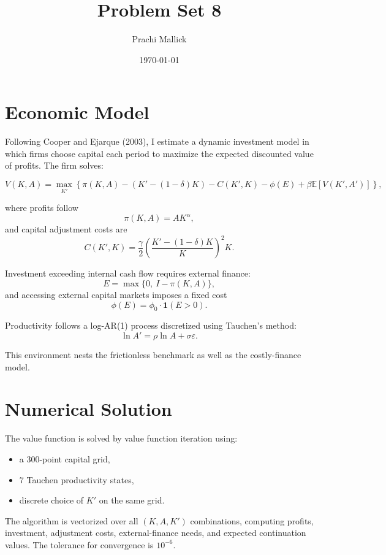 \documentclass[12pt]{article}
\begin{document}
\title{Problem Set 8}
\author{Prachi Mallick}
\date{\today}
\maketitle

\section{Economic Model}

Following Cooper and Ejarque (2003), I estimate a dynamic investment model in which
firms choose capital each period to maximize the expected discounted value of profits.
The firm solves:

\begin{equation}
V(K,A) = \max_{K'} \left\{
\pi(K,A)
- \left(K' - (1-\delta)K\right)
- C(K',K)
- \phi(E)
+ \beta \mathbb{E}[V(K',A')]
\right\},
\end{equation}

where profits follow
\[
\pi(K,A)=A K^\alpha,
\]
and capital adjustment costs are
\[
C(K',K)= \frac{\gamma}{2}\left( \frac{K' - (1-\delta)K}{K} \right)^2 K.
\]

Investment exceeding internal cash flow requires external finance:
\[
E = \max\{0,\ I - \pi(K,A)\},
\]
and accessing external capital markets imposes a fixed cost
\[
\phi(E) = \phi_0 \cdot \mathbf{1}(E>0).
\]

Productivity follows a log-AR(1) process discretized using Tauchen’s method:
\[
\ln A' = \rho \ln A + \sigma \varepsilon.
\]

This environment nests the frictionless benchmark as well as the costly-finance model.

\section{Numerical Solution}

The value function is solved by value function iteration using:

\begin{itemize}
    \item a 300-point capital grid,
    \item 7 Tauchen productivity states,
    \item discrete choice of $K'$ on the same grid.
\end{itemize}

The algorithm is vectorized over all $(K,A,K')$ combinations, computing profits,
investment, adjustment costs, external-finance needs, and expected continuation values.
The tolerance for convergence is $10^{-6}$.
\end{document}
